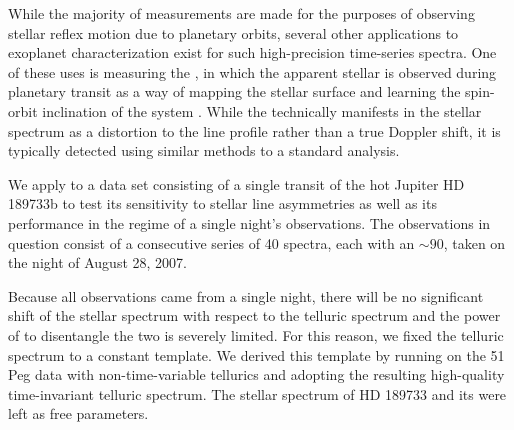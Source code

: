 \documentclass[modern]{aastex62}
\begin{document}
While the majority of \EPRV measurements are made for the purposes of observing stellar reflex motion due to planetary orbits, several other applications to exoplanet characterization exist for such high-precision time-series spectra. 
One of these uses is measuring the \RM, in which the apparent stellar \RV is observed during planetary transit as a way of mapping the stellar surface and learning the spin-orbit inclination of the system \citep[e.g.][]{Queloz2000, Winn2005}. 
While the \RM technically manifests in the stellar spectrum as a distortion to the line profile rather than a true Doppler shift, it is typically detected using similar methods to a standard \RV analysis. 

We apply \wobble to a data set consisting of a single transit of the hot Jupiter HD 189733b to test its sensitivity to stellar line asymmetries as well as its performance in the regime of a single night's observations. 
The observations in question consist of a consecutive series of 40 spectra, each with an \SNR $\sim 90$, taken on the night of August 28, 2007.

Because all observations came from a single night, there will be no significant shift of the stellar spectrum with respect to the telluric spectrum and the power of \wobble to disentangle the two is severely limited. 
For this reason, we fixed the telluric spectrum to a constant template. 
We derived this template by running \wobble on the 51 Peg data with non-time-variable tellurics and adopting the resulting high-quality time-invariant telluric spectrum. 
The stellar spectrum of HD 189733 and its \RVs were left as free parameters.
\end{document}
